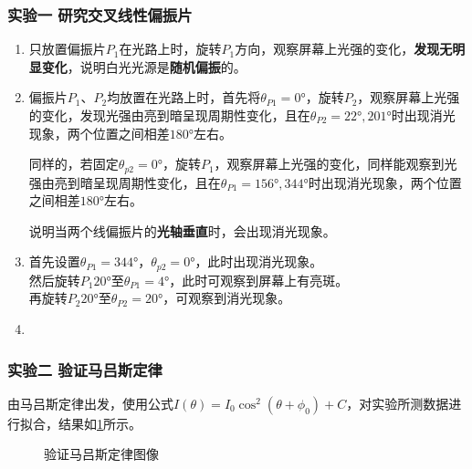 \documentclass[dvipsnames, svgnames,a4paper,11pt]{article}
\begin{document}
	\subsubsection{实验一 \quad 研究交叉线性偏振片}

	\begin{enumerate}
		\item 只放置偏振片$P_1$在光路上时，旋转$P_1$方向，观察屏幕上光强的变化，\textbf{发现无明显变化}，说明白光光源是\textbf{随机偏振}的。
		\item 偏振片$P_1$、$P_2$均放置在光路上时，首先将$\theta_{P1}=\ang{0}$，旋转$P_2$，观察屏幕上光强的变化，发现光强由亮到暗呈现周期性变化，且在$\theta_{P2}=\ang{22},\ang{201}$时出现消光现象，两个位置之间相差$\ang{180}$左右。
		
		同样的，若固定$\theta_{p2}=\ang{0}$，旋转$P_1$，观察屏幕上光强的变化，同样能观察到光强由亮到暗呈现周期性变化，且在$\theta_{P1}=\ang{156},\ang{344}$时出现消光现象，两个位置之间相差$\ang{180}$左右。

		说明当两个线偏振片的\textbf{光轴垂直}时，会出现消光现象。

		\item 首先设置$\theta_{P1}=\ang{344}$，$\theta_{p2}=\ang{0}$，此时出现消光现象。\\
			  然后旋转$P_1$$\ang{20}$至$\theta_{P1}=\ang{4}$，此时可观察到屏幕上有亮斑。\\
			  再旋转$P_2$$\ang{20}$至$\theta_{P2}=\ang{20}$，可观察到消光现象。

		\item 
	\end{enumerate}




	\subsubsection{实验二 \quad 验证马吕斯定律}

	由马吕斯定律出发，使用公式$I(\theta)=I_0\cos^2(\theta+\phi_0)+C$，对实验所测数据进行拟合，结果如\cref{fig:graph3-2}所示。

	\begin{figure}[htbp]
		\centering
		\quad
		\quad
		\quad

		\caption{验证马吕斯定律图像}
		\label{fig:graph3-2}
		
	\end{figure}
\end{document}
